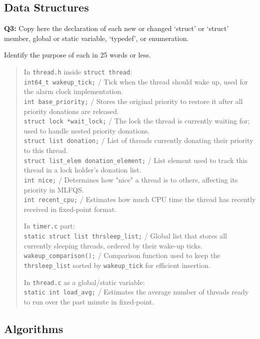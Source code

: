 \documentclass[a4paper,11pt]{paper}
\begin{document}
\subsection{Data Structures}

\textbf{Q3:} Copy here the declaration of each new or changed `struct' or
`struct' member, global or static variable, `typedef', or enumeration.

Identify the purpose of each in 25 words or less.
\begin{quote}
In \texttt{thread.h} inside \texttt{struct thread}:\\
  \texttt{int64\_t wakeup\_tick;} / Tick when the thread should wake up, used for the alarm clock implementation.\\
  \texttt{int base\_priority;} / Stores the original priority to restore it after all priority donations are released.\\
  \texttt{struct lock *wait\_lock;} / The lock the thread is currently waiting for; used to handle nested priority donations.\\
  \texttt{struct list donation;} / List of threads currently donating their priority to this thread.\\
  \texttt{struct list\_elem donation\_element;} / List element used to track this thread in a lock holder's donation list.\\
  \texttt{int nice;} / Determines how "nice" a thread is to others, affecting its priority in MLFQS.\\
  \texttt{int recent\_cpu;} / Estimates how much CPU time the thread has recently received in fixed-point format.

\vspace{0.5em}
In \texttt{timer.c} part:\\
  \texttt{static struct list thrsleep\_list;} / Global list that stores all currently sleeping threads, ordered by their wake-up ticks.\\
  \texttt{wakeup\_comparison();} / Comparison function used to keep the \texttt{thrsleep\_list} sorted by \texttt{wakeup\_tick} for efficient insertion.

\vspace{0.5em}
In \texttt{thread.c} as a global/static variable:\\
  \texttt{static int load\_avg;} / Estimates the average number of threads ready to run over the past minute in fixed-point.
\end{quote}

\subsection{Algorithms}
\end{document}
